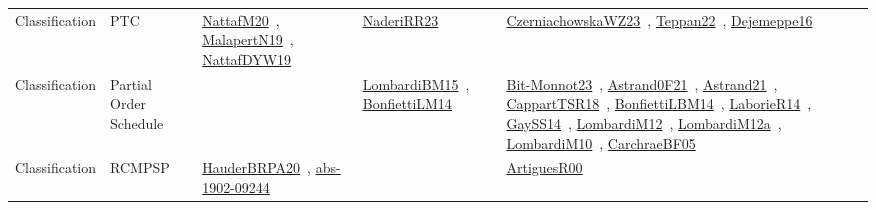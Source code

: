 {\begin{longtable}{lp{3cm}>{\raggedright\arraybackslash}p{6cm}>{\raggedright\arraybackslash}p{6cm}>{\raggedright\arraybackslash}p{8cm}}
Classification & PTC & \href{../works/NattafM20.pdf}{NattafM20}~\cite{NattafM20}, \href{../works/MalapertN19.pdf}{MalapertN19}~\cite{MalapertN19}, \href{../works/NattafDYW19.pdf}{NattafDYW19}~\cite{NattafDYW19} & \href{../works/NaderiRR23.pdf}{NaderiRR23}~\cite{NaderiRR23} & \href{../works/CzerniachowskaWZ23.pdf}{CzerniachowskaWZ23}~\cite{CzerniachowskaWZ23}, \href{../works/Teppan22.pdf}{Teppan22}~\cite{Teppan22}, \href{../works/Dejemeppe16.pdf}{Dejemeppe16}~\cite{Dejemeppe16}\\
Classification & Partial Order Schedule &  & \href{../works/LombardiBM15.pdf}{LombardiBM15}~\cite{LombardiBM15}, \href{../works/BonfiettiLM14.pdf}{BonfiettiLM14}~\cite{BonfiettiLM14} & \href{../works/Bit-Monnot23.pdf}{Bit-Monnot23}~\cite{Bit-Monnot23}, \href{../works/Astrand0F21.pdf}{Astrand0F21}~\cite{Astrand0F21}, \href{../works/Astrand21.pdf}{Astrand21}~\cite{Astrand21}, \href{../works/CappartTSR18.pdf}{CappartTSR18}~\cite{CappartTSR18}, \href{../works/BonfiettiLBM14.pdf}{BonfiettiLBM14}~\cite{BonfiettiLBM14}, \href{../works/LaborieR14.pdf}{LaborieR14}~\cite{LaborieR14}, \href{../works/GaySS14.pdf}{GaySS14}~\cite{GaySS14}, \href{../works/LombardiM12.pdf}{LombardiM12}~\cite{LombardiM12}, \href{../works/LombardiM12a.pdf}{LombardiM12a}~\cite{LombardiM12a}, \href{../works/LombardiM10.pdf}{LombardiM10}~\cite{LombardiM10}, \href{../works/CarchraeBF05.pdf}{CarchraeBF05}~\cite{CarchraeBF05}\\
Classification & RCMPSP & \href{../works/HauderBRPA20.pdf}{HauderBRPA20}~\cite{HauderBRPA20}, \href{../works/abs-1902-09244.pdf}{abs-1902-09244}~\cite{abs-1902-09244} &  & \href{../works/ArtiguesR00.pdf}{ArtiguesR00}~\cite{ArtiguesR00}\\

\end{longtable}}
